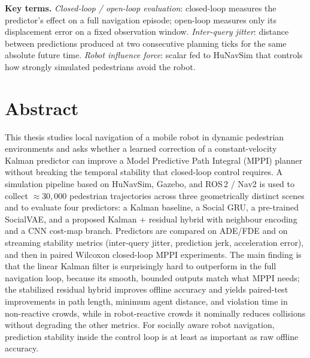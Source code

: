 \documentclass[12pt, a4paper]{article}
\begin{document}
\textbf{Key terms.} \emph{Closed-loop / open-loop evaluation}: closed-loop measures the predictor's effect on a full navigation episode; open-loop measures only its displacement error on a fixed observation window. \emph{Inter-query jitter}: distance between predictions produced at two consecutive planning ticks for the same absolute future time. \emph{Robot influence force}: scalar fed to HuNavSim that controls how strongly simulated pedestrians avoid the robot.

\newpage

\section*{Abstract}

This thesis studies local navigation of a mobile robot in dynamic pedestrian environments and asks whether a learned correction of a constant-velocity Kalman predictor can improve a Model Predictive Path Integral (MPPI) planner without breaking the temporal stability that closed-loop control requires. A simulation pipeline based on HuNavSim, Gazebo, and ROS\,2 / Nav2 is used to collect $\approx 30{,}000$ pedestrian trajectories across three geometrically distinct scenes and to evaluate four predictors: a Kalman baseline, a Social GRU, a pre-trained SocialVAE, and a proposed Kalman + residual hybrid with neighbour encoding and a CNN cost-map branch. Predictors are compared on ADE/FDE and on streaming stability metrics (inter-query jitter, prediction jerk, acceleration error), and then in paired Wilcoxon closed-loop MPPI experiments. The main finding is that the linear Kalman filter is surprisingly hard to outperform in the full navigation loop, because its smooth, bounded outputs match what MPPI needs; the stabilized residual hybrid improves offline accuracy and yields paired-test improvements in path length, minimum agent distance, and violation time in non-reactive crowds, while in robot-reactive crowds it nominally reduces collisions without degrading the other metrics. For socially aware robot navigation, prediction stability inside the control loop is at least as important as raw offline accuracy.

\newpage

\end{document}
